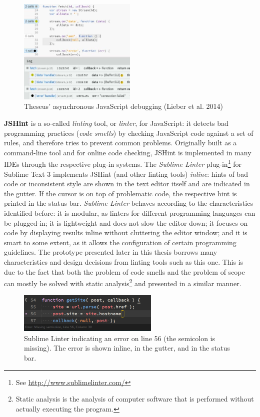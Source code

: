 \begin{figure}[htbp]
\centering
\includegraphics[keepaspectratio,width=0.5\textwidth]{img/theseus.jpg}
\caption{Theseus’ asynchronous JavaScript debugging (Lieber et al. 2014)}
\label{fig:theseus}
\end{figure}

\textbf{JSHint} is a so-called \emph{linting} tool, or \emph{linter},
for JavaScript: it detects bad programming practices (\emph{code
smells}) by checking JavaScript code against a set of rules, and
therefore tries to prevent common problems. Originally built as a
command-line tool and for online code checking, JSHint is implemented in
many IDEs through the respective plug-in systems. The \emph{Sublime
Linter} plug-in\footnote{See \url{http://www.sublimelinter.com/}} for
Sublime Text 3 implements JSHint (and other linting tools)
\emph{inline}: hints of bad code or inconsistent style are shown in the
text editor itself and are indicated in the gutter. If the cursor is on
top of problematic code, the respective hint is printed in the status
bar. \emph{Sublime Linter} behaves according to the characteristics
identified before: it is modular, as linters for different programming
languages can be plugged-in; it is lightweight and does not slow the
editor down; it focuses on code by displaying results inline without
cluttering the editor window; and it is smart to some extent, as it
allows the configuration of certain programming guidelines. The
prototype presented later in this thesis borrows many characteristics
and design decisions from linting tools such as this one. This is due to
the fact that both the problem of code smells and the problem of scope
can mostly be solved with static
analysis\footnote{Static analysis is the analysis of computer software that is performed without actually executing the program.}
and presented in a similar manner.

\begin{figure}[H]
\centering
\includegraphics[keepaspectratio,width=0.6\textwidth]{img/jshint.png}
\caption{Sublime Linter indicating an error on line 56 (the semicolon is missing). The error is shown inline, in the gutter, and in the status bar.}
\label{fig:sublimelinter}
\end{figure}

